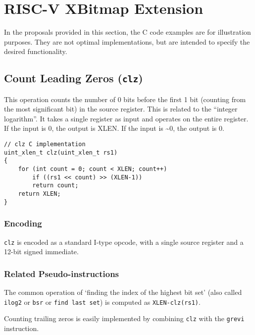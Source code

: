 \chapter{RISC-V XBitmap Extension}\label{risc-v-b-hardware-instructions}

In the proposals provided in this section, the C code examples are for
illustration purposes. They are not optimal implementations, but are
intended to specify the desired functionality.


\section{Count Leading Zeros (\texttt{clz})}

This operation counts the number of 0 bits before the first 1 bit
(counting from the most significant bit) in the source register. This is
related to the ``integer logarithm''. It takes a single register as
input and operates on the entire register. If the input is 0, the output is
XLEN. If the input is \textasciitilde{}0, the output is 0.

\begin{verbatim}
// clz C implementation
uint_xlen_t clz(uint_xlen_t rs1)
{
    for (int count = 0; count < XLEN; count++)
        if ((rs1 << count) >> (XLEN-1))
	    return count;
    return XLEN;
}
\end{verbatim}

\subsection{Encoding}



\texttt{clz} is encoded as a standard I-type opcode, with a single
source register and a 12-bit signed immediate.

\subsection{Related Pseudo-instructions}

The common operation of `finding the index of the highest bit set' (also called
\texttt{ilog2} or \texttt{bsr} or \texttt{find\ last\ set}) is computed as
\texttt{XLEN-clz(rs1)}.

Counting trailing zeros is easily implemented by combining \texttt{clz} with
the \texttt{grevi} instruction.


